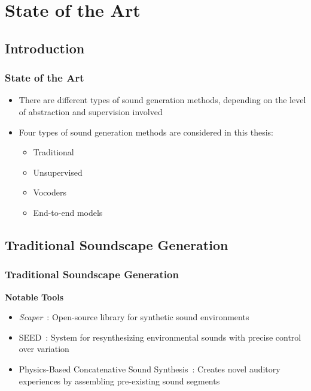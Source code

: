 \section{State of the Art}

\subsection{Introduction}
\begin{frame}
    \frametitle{State of the Art}
    \begin{itemize}
        \item There are different types of sound generation methods, depending on the level of abstraction and supervision involved
        \item Four types of sound generation methods are considered in this thesis:
              \begin{itemize}
                  \item Traditional
                  \item Unsupervised
                  \item Vocoders
                  \item End-to-end models
              \end{itemize}
    \end{itemize}
\end{frame}


\subsection{Traditional Soundscape Generation}

\begin{frame}
    \frametitle{Traditional Soundscape Generation}

    \textbf{Notable Tools}
    \begin{itemize}
        \item \textit{Scaper}~\cite{salamon_scaper_2017}: Open-source library for synthetic sound environments
        \item SEED~\cite{bernardes_seed_2016}: System for resynthesizing environmental sounds with precise control over variation
        \item Physics-Based Concatenative Sound Synthesis~\cite{magalhaes_physics-based_2020}: Creates novel auditory experiences by assembling pre-existing sound segments
    \end{itemize}
\end{frame}


